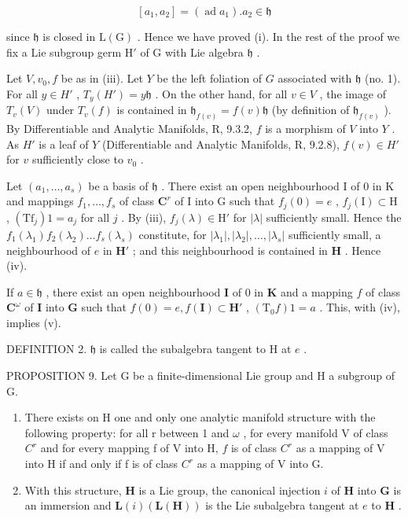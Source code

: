 \[
\left[ a _ {1}, a _ {2} \right] = (\operatorname{ad} a _ {1}). a _ {2} \in \mathfrak {h}
\]

since \(\mathfrak{h}\) is closed in \(\mathrm{L}(\mathrm{G})\) . Hence we have proved (i). In the rest of the proof we fix a Lie subgroup germ \(\mathrm{H}'\) of \(\mathrm{G}\) with Lie algebra \(\mathfrak{h}\) .

Let \(V, v_0, f\) be as in (iii). Let \(Y\) be the left foliation of \(G\) associated with \(\mathfrak{h}\) (no. 1). For all \(y \in H'\) , \(T_y(H') = y\mathfrak{h}\) . On the other hand, for all \(v \in V\) , the image of \(T_v(V)\) under \(T_v(f)\) is contained in \(\mathfrak{h}_{f(v)} = f(v)\mathfrak{h}\) (by definition of \(\mathfrak{h}_{f(v)}\) ). By Differentiable and Analytic Manifolds, R, 9.3.2, \(f\) is a morphism of \(V\) into \(Y\) . As \(H'\) is a leaf of \(Y\) (Differentiable and Analytic Manifolds, R, 9.2.8), \(f(v) \in H'\) for \(v\) sufficiently close to \(v_0\) .

Let \((a_{1},\ldots ,a_{s})\) be a basis of \(\mathfrak{h}\) . There exist an open neighbourhood I of 0 in K and mappings \(f_{1},\ldots ,f_{s}\) of class \(\mathbf{C}^r\) of I into G such that \(f_{j}(0) = e\) , \(f_{j}(\mathrm{I})\subset \mathrm{H}\) , \((\mathrm{Tf}_j)1 = a_j\) for all \(j\) . By (iii), \(f_{j}(\lambda)\in \mathrm{H}'\) for \(|\lambda |\) sufficiently small. Hence the \(f_{1}(\lambda_{1})f_{2}(\lambda_{2})\ldots f_{s}(\lambda_{s})\) constitute, for \(|\lambda_1|,\left|\lambda_2\right|,\ldots ,|\lambda_s|\) sufficiently small, a neighbourhood of \(e\) in \(\mathbf{H}'\) ; and this neighbourhood is contained in \(\mathbf{H}\) . Hence (iv).

If \(a \in \mathfrak{h}\) , there exist an open neighbourhood \(\mathbf{I}\) of 0 in \(\mathbf{K}\) and a mapping \(f\) of class \(\mathbf{C}^{\omega}\) of \(\mathbf{I}\) into \(\mathbf{G}\) such that \(f(0) = e, f(\mathbf{I}) \subset \mathbf{H}'\) , \((\mathrm{T}_0f)1 = a\) . This, with (iv), implies (v).

DEFINITION 2. \(\mathfrak{h}\) is called the subalgebra tangent to H at \(e\) .

PROPOSITION 9. Let G be a finite-dimensional Lie group and H a subgroup of G.

\begin{enumerate}
\def\labelenumi{(\roman{enumi})}
\item
  There exists on H one and only one analytic manifold structure with the following property: for all r between 1 and \(\omega\) , for every manifold V of class \(C^r\) and for every mapping f of V into H, \(f\) is of class \(C^r\) as a mapping of V into H if and only if f is of class \(C^r\) as a mapping of V into G.
\item
  With this structure, \(\mathbf{H}\) is a Lie group, the canonical injection \(i\) of \(\mathbf{H}\) into \(\mathbf{G}\) is an immersion and \(\mathbf{L}(i)(\mathbf{L}(\mathbf{H}))\) is the Lie subalgebra tangent at \(e\) to \(\mathbf{H}\) .
\end{enumerate}

